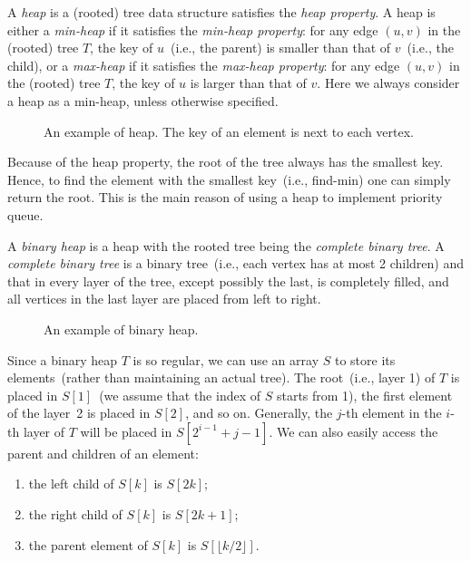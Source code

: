 
A \emph{heap} is a (rooted) tree data structure satisfies the \emph{heap property}.
A heap is either a \emph{min-heap} if it satisfies the \emph{min-heap property}: for any edge $(u, v)$ in the (rooted) tree $T$,
the key of $u$~(i.e., the parent) is smaller than that of $v$~(i.e., the child),
or a \emph{max-heap} if it satisfies the \emph{max-heap property}: for any edge $(u, v)$ in the (rooted) tree $T$,
the key of $u$ is larger than that of $v$.
Here we always consider a heap as a min-heap, unless otherwise specified.

\begin{figure}[h!]
\centering{}
\caption{An example of heap. The key of an element is next to each vertex.}
\end{figure}

Because of the heap property, the root of the tree always has the smallest key.
Hence, to find the element with the smallest key~(i.e., find-min) one can simply
return the root. This is the main reason of using a heap to implement priority queue.

A \emph{binary heap} is a heap with the rooted tree being the \emph{complete binary tree}.
A \emph{complete binary tree} is a binary tree~(i.e., each vertex has at most 2 children)
and that in every layer of the tree, except possibly the last, is completely filled, and all vertices in the last layer are placed from left to right.

\begin{figure}[h!]
\centering{}
\caption{An example of binary heap.}
\end{figure}

Since a binary heap $T$ is so regular, we can use an array $S$ to store its elements~(rather than maintaining an actual tree).
The root~(i.e., layer 1) of $T$ is placed in $S[1]$~(we assume that the index of $S$ starts from 1),
the first element of the layer~2 is placed in $S[2]$, and so on.
Generally, the $j$-th element in the $i$-th layer of $T$ will be placed in $S[2^{i-1} + j - 1]$.
We can also easily access the parent and children of an element:
\vspace*{-\topsep}
\begin{enumerate}
\item the left child of $S[k]$ is $S[2k]$; 
\item the right child of $S[k]$ is $S[2k + 1]$;
\item the parent element of $S[k]$ is $S[\lfloor k/2 \rfloor]$.
\end{enumerate}

